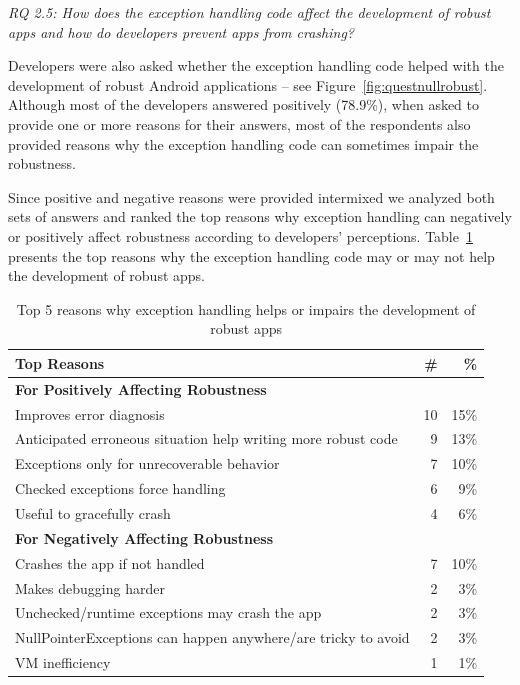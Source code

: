 {\noindent\emph{RQ 2.5: How does the exception handling code affect the development of robust apps and how do developers prevent apps from crashing?}

\bigskip

Developers were also asked whether the exception handling code helped with the development of robust Android applications -- see Figure~\ref{fig:questnullrobust}. Although most of the developers answered positively (78.9\%), when asked to provide one or more reasons for their answers, most of the respondents also provided reasons why the exception handling code can sometimes impair the robustness.

Since positive and negative reasons were provided intermixed we analyzed both sets of answers and ranked the top reasons why exception handling can negatively or positively affect robustness according to developers' perceptions. Table~\ref{tab:topreasons} presents the top reasons why the exception handling code may or may not help the development of robust apps.

\begin{table}
\scriptsize
\centering
\begin{tabular}{lrr}
\hline
\bfseries{Top Reasons} & \bfseries{\#} & \bfseries{\%} \\
\hline
\bfseries{For Positively Affecting Robustness} &   &   \\
Improves error diagnosis  &	10	& 15\% \\
Anticipated erroneous situation help writing more robust code  & 9	 & 13\% \\
Exceptions only for unrecoverable behavior	& 7 &	10\% \\
Checked exceptions force handling  &	6	& 9\% \\
Useful to gracefully crash 	& 4 &	6\% \\

\bfseries{For Negatively Affecting Robustness} &   &   \\
Crashes the app if not handled	 & 7	& 10\% \\
Makes debugging harder &	2 &	3\% \\
Unchecked/runtime exceptions may crash the app & 2	& 3\% \\
NullPointerExceptions can happen anywhere/are tricky to avoid	 & 2	& 3\% \\
VM inefficiency 	& 1 & 1\% \\

\hline
\end{tabular}
\caption{Top 5 reasons why exception handling helps or impairs the development of robust apps}
\label{tab:topreasons}
\end{table}

}
